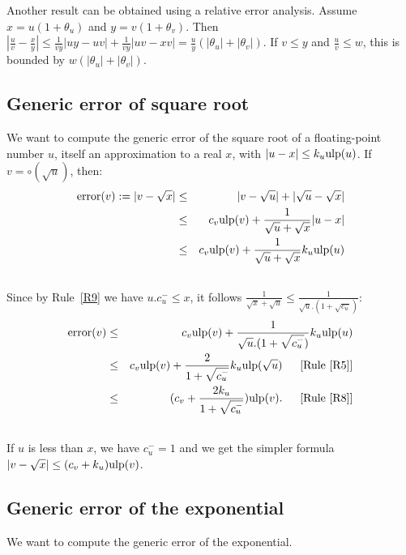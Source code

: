 \documentclass[12pt]{amsart}
\def\ulp{{\rm ulp}}
\newcommand{\U}[1]{\quad \mbox{[Rule~\ref{#1}]}}
\DeclareMathOperator{\error}{error}
\begin{document}
Another result can be obtained using a relative error analysis.
Assume $x = u (1 + \theta_u)$ and $y = v (1 + \theta_v)$. Then
$|\frac{u}{v} - \frac{x}{y}| \leq \frac{1}{vy} |uy - uv|
+ \frac{1}{vy} |uv - xv|
= \frac{u}{y} (|\theta_u|+|\theta_v|)$.
If $v \leq y$ and $\frac{u}{v} \leq w$,
this is bounded by $w (|\theta_u|+|\theta_v|)$.

\subsection{Generic error of square root}\label{generic:sqrt}


We want to compute the generic error of the square root of a floating-point
number $u$, itself an approximation to a real $x$,
with $|u - x| \leq k_u \ulp(u)$.
If $v = \circ(\sqrt{u})$, then:
\begin{eqnarray}\nonumber
\error(v) := |v - \sqrt{x}|
& \leq &|v - \sqrt{u}| +|\sqrt{u} - \sqrt{x}| \\\nonumber
& \leq & c_v \ulp(v) + \frac{1}{\sqrt{u} + \sqrt{x}}|u-x| \\\nonumber
& \leq & c_v \ulp(v) + \frac{1}{\sqrt{u} + \sqrt{x}} k_u \ulp(u) \\\nonumber
\end{eqnarray}
Since by Rule~\ref{R9} we have $u.c_u^- \leq x$,
it follows $\frac{1}{\sqrt{x}+\sqrt{u}} \leq
        \frac{1}{\sqrt{u}.(1+\sqrt{c_u^-})}$:
\begin{eqnarray}\nonumber
\error(v)& \leq & c_v \ulp(v) +
                 \frac{1}{\sqrt{u}.(1+\sqrt{c_u^-})}  k_u \ulp(u) \\\nonumber
& \leq & c_v \ulp(v) + \frac{2}{1+\sqrt{c_u^-}}
       k_u \ulp(\sqrt{u}) \;\; \U{R5}\\\nonumber
& \leq & (c_v + \frac{2k_u}{1+\sqrt{c_u^-}})  \ulp(v). \;\; \U{R8}\\\nonumber
\end{eqnarray}
If $u$ is less than $x$, we have $c_u^-=1$ and
we get the simpler formula
$|v-\sqrt{x}| \leq (c_v + k_u)  \ulp(v)$.

\subsection{Generic error of the exponential }\label{generic:exp}


We want to compute the generic error of the exponential.
\end{document}
